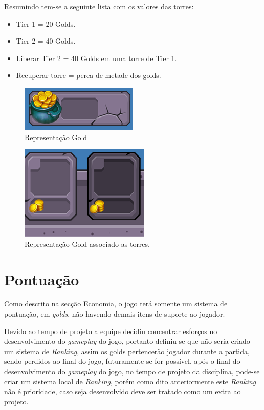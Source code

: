 \documentclass[11pt]{article} %
\begin{document}
Resumindo tem-se a seguinte lista com os valores das torres:
\begin{itemize}
 \item Tier 1 = 20 Golds.
 \item Tier 2 = 40 Golds.
 \item Liberar Tier 2 = 40 Golds em uma torre de Tier 1.
 \item Recuperar torre = perca de metade dos golds.
\end{itemize} 

\begin{figure}[!htp]
\centering
\includegraphics[scale=1.25]{res/gold.png}
\caption{Representação Gold}
\label{Tela Equip}
\end{figure}

\begin{figure}[!htp]
\centering
\includegraphics[scale=1.0]{res/torresGold.png}
\caption{Representação Gold associado as torres.}
\label{Tela Equip}
\end{figure}

\newpage

\section{Pontuação}
Como descrito na secção Economia, o jogo terá somente um sistema de pontuação, em \textit{golds}, não havendo demais itens de suporte ao jogador.

Devido ao tempo de projeto a equipe decidiu concentrar esforços no desenvolvimento do \textit{gameplay} do jogo, portanto definiu-se que não seria criado um sistema de \textit{Ranking}, assim os golds pertencerão jogador durante a partida, sendo perdidos ao final do jogo, futuramente se for possível, após o final do desenvolvimento do \textit{gameplay} do jogo, no tempo de projeto da disciplina, pode-se criar um sistema local de \textit{Ranking}, porém como dito anteriormente este \textit{Ranking} não é prioridade, caso seja desenvolvido deve ser tratado como um extra ao projeto.  
\end{document}
